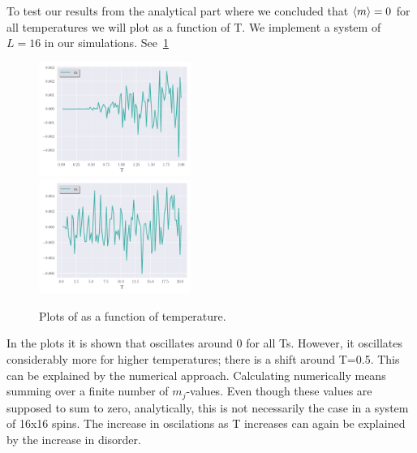     To test our results from the analytical part where we concluded that $\left\langle m\right\rangle=0$ for all temperatures we will plot  as a function of T. We implement a system of $L=16$ in our simulations. See~\cref{fig:m_T} 

    \begin{figure}[h!]
        \centering
        \includegraphics[width=0.44\textwidth]{../figs/m_T_2.pdf}\\
        \includegraphics[width=0.44\textwidth]{../figs/m_T_20.pdf}
        \caption{Plots of  as a function of temperature.}
        \label{fig:m_T}
    \end{figure}

    In the plots it is shown that  oscillates around 0 for all Ts. However, it oscillates considerably more for higher temperatures; there is a shift around T=0.5. This can be explained by the numerical approach. Calculating  numerically means summing over a finite number of $m_j$-values. Even though these values are supposed to sum to zero, analytically, this is not necessarily the case in a system of 16x16 spins. The increase in oscilations as T increases can again be explained by the increase in disorder.   



